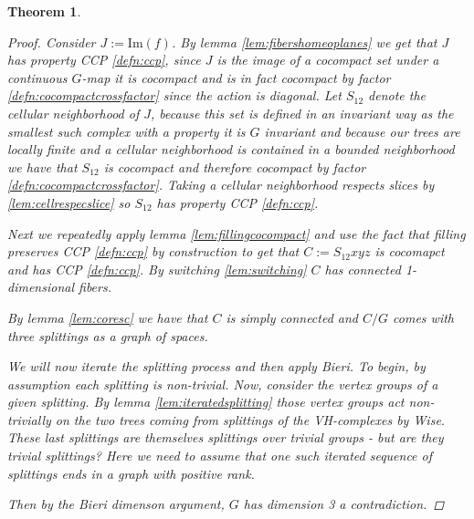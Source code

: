 \documentclass{article}
\theoremstyle{mystyle}
\newtheorem{thm}{Theorem}[section]
\theoremstyle{remark}
\begin{document}
\begin{thm}
\begin{proof}
        Consider \(J := \text{Im}(f)\). By lemma \ref{lem:fibershomeoplanes} we get that \(J\) has property CCP \ref{defn:ccp}, since \(J\) is the image of a cocompact set under a continuous \(G\)-map it is cocompact and is in fact cocompact by factor \ref{defn:cocompactcrossfactor} since the action is diagonal. Let \(S_{12}\) denote the cellular neighborhood of \(J\), because this set is defined in an invariant way as the smallest such complex with a property it is \(G\) invariant and because our trees are locally finite and a cellular neighborhood is contained in a bounded neighborhood we have that \(S_{12}\) is cocompact and therefore cocompact by factor \ref{defn:cocompactcrossfactor}. Taking a cellular neighborhood respects slices by \ref{lem:cellrespecslice}  so \(S_{12}\) has property CCP \ref{defn:ccp}. 

        Next we repeatedly apply lemma \ref{lem:fillingcocompact} and use the fact that filling preserves CCP \ref{defn:ccp} by construction to get that \(C:= S_{12}xyz\) is cocomapct and has CCP \ref{defn:ccp}. By switching \ref{lem:switching} \(C\) has connected 1-dimensional fibers. 

        By lemma \ref{lem:coresc} we have that \(C\) is simply connected and \(C/G\) comes with three splittings as a graph of spaces.

        We will now iterate the splitting process and then apply Bieri. To begin, by assumption each splitting is non-trivial. Now, consider the vertex groups of a given splitting. By lemma \ref{lem:iteratedsplitting} those vertex groups act non-trivially on the two trees coming from splittings of the VH-complexes by Wise. These last splittings are themselves splittings over trivial groups - but are they trivial splittings? Here we need to assume that one such iterated sequence of splittings ends in a graph with positive rank.
        
        Then by the Bieri dimenson argument, \(G\) has dimension 3 a contradiction.
    \end{proof}
\end{thm}
\end{document}
